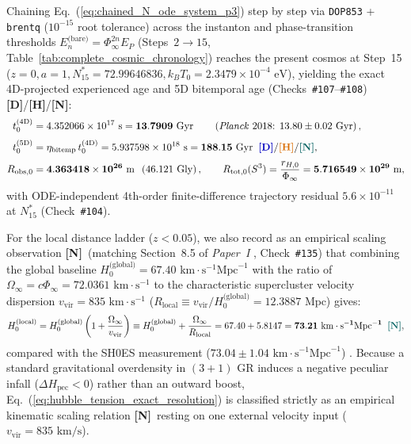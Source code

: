 \documentclass[11pt,a4paper]{article}
\newcommand{\catD}{\textbf{\textcolor{blue!75!black}{[D]}}}
\newcommand{\catH}{\textbf{\textcolor{orange!85!black}{[H]}}}
\newcommand{\catN}{\textbf{\textcolor{teal!75!black}{[N]}}}
\theoremstyle{plain}
\theoremstyle{definition}
\theoremstyle{remark}
\numberwithin{equation}{section}
\begin{document}
Chaining Eq.~(\ref{eq:chained_N_ode_system_p3}) step by step via \texttt{DOP853} + \texttt{brentq} ($10^{-15}$ root tolerance) across the instanton and phase-transition thresholds $E_n^{\text{(bare)}} = \Phi_{\infty}^{2n}E_P$ (Steps~$2 \to 15$, Table~\ref{tab:complete_cosmic_chronology}) reaches the present cosmos at Step~15 ($z = 0, a = 1, N_{15}^* = 72.99646836, k_B T_0 = 2.3479 \times 10^{-4}\text{ eV}$), yielding the exact 4D-projected experienced age and 5D bitemporal age (Checks~\texttt{\#107}--\texttt{\#108}) \catD/\catH/\catN:
\begin{align}
  t_0^{\text{(4D)}} &= 4.352066 \times 10^{17}\text{ s} = \mathbf{13.7909\text{ Gyr}} \qquad \left(\text{\textit{Planck} 2018: } 13.80 \pm 0.02\text{ Gyr}\right), \nonumber \\[3pt]
  t_0^{\text{(5D)}} &= \eta_{\text{bitemp}}\,t_0^{\text{(4D)}} = 5.937598 \times 10^{18}\text{ s} = \mathbf{188.15\text{ Gyr}} \;\;\catD/\catH/\catN, \nonumber \\[3pt]
  R_{\text{obs},0} &= \mathbf{4.363418 \times 10^{26}\text{ m}} \;\; \left(46.121\text{ Gly}\right), \qquad R_{\text{tot},0}(S^3) = \frac{r_{H,0}}{\Phi_{\infty}} = \mathbf{5.716549 \times 10^{29}\text{ m}},
  \label{eq:exact_1408_gyr_age}
\end{align}
with ODE-independent 4th-order finite-difference trajectory residual $5.6 \times 10^{-11}$ at $N_{15}^*$ (Check~\texttt{\#104}).

For the local distance ladder ($z < 0.05$), we also record as an empirical scaling observation \catN\ (matching Section~8.5 of \textit{Paper~I} \cite{jimenez2026a}, Check~\texttt{\#135}) that combining the global baseline $H_0^{\text{(global)}} = 67.40\text{ km}\cdot\text{s}^{-1}\text{Mpc}^{-1}$ with the ratio of $\Omega_{\infty} = c\Phi_{\infty} = 72.0361\text{ km}\cdot\text{s}^{-1}$ to the characteristic supercluster velocity dispersion $v_{\text{vir}} = 835\text{ km}\cdot\text{s}^{-1}$ ($R_{\text{local}} \equiv v_{\text{vir}}/H_0^{\text{(global)}} = 12.3887\text{ Mpc}$) gives:
\begin{equation}
H_0^{\text{(local)}} = H_0^{\text{(global)}}\left(1 + \frac{\Omega_{\infty}}{v_{\text{vir}}}\right) \equiv H_0^{\text{(global)}} + \frac{\Omega_{\infty}}{R_{\text{local}}} = 67.40 + 5.8147 = \mathbf{73.21\text{ km}\cdot\text{s}^{-1}\text{Mpc}^{-1}} \;\;\catN,
\label{eq:hubble_tension_exact_resolution}
\end{equation}
compared with the SH0ES measurement ($73.04 \pm 1.04\text{ km}\cdot\text{s}^{-1}\text{Mpc}^{-1}$) \cite{riess2022}. Because a standard gravitational overdensity in $(3+1)$ GR induces a negative peculiar infall ($\Delta H_{\text{pec}} < 0$) rather than an outward boost, Eq.~(\ref{eq:hubble_tension_exact_resolution}) is classified strictly as an empirical kinematic scaling relation \catN\ resting on one external velocity input ($v_{\text{vir}} = 835\text{ km/s}$).
\end{document}
